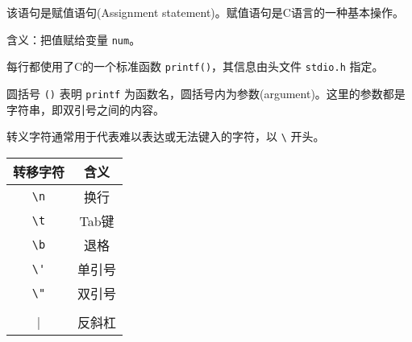 \begin{frame}[fragile]

  
  该语句是赋值语句(Assignment statement)。赋值语句是C语言的一种基本操作。\vspace{0.1in}

  含义：把值赋给变量 \lstinline|num|。
  
\end{frame}


\begin{frame}[fragile]
  

  每行都使用了C的一个标准函数 \lstinline|printf()|，其信息由头文件 \lstinline|stdio.h| 指定。
  \vspace{0.1in}

  圆括号 \lstinline|()| 表明 \lstinline|printf| 为函数名，圆括号内为参数(argument)。这里的参数都是字符串，即双引号之间的内容。
  
\end{frame}


\begin{frame}[fragile]
      
  转义字符通常用于代表难以表达或无法键入的字符，以 \lstinline|\| 开头。
  
  \begin{table}
    \centering
    \begin{tabular}{cc} \hline
      转移字符 & 含义 \\ \hline  
      \lstinline|\n| & 换行\\
      \lstinline|\t| & Tab键\\
      \lstinline|\b| & 退格\\
      \lstinline|\'| & 单引号\\
      \lstinline|\"| & 双引号\\
      \lstinline|\\| & 反斜杠\\
      \hline 
    \end{tabular}
  \end{table}
\end{frame}


